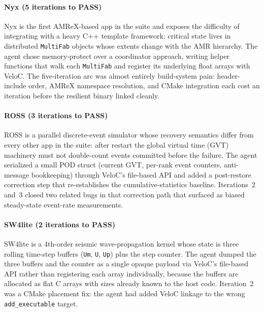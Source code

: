 \documentclass[conference]{IEEEtran}
\begin{document}
\paragraph{Nyx (5 iterations to PASS)}
Nyx is the first AMReX-based app in the suite and exposes the difficulty of integrating with a heavy C++ template framework: critical state lives in distributed \texttt{MultiFab} objects whose extents change with the AMR hierarchy. The agent chose memory-protect over a coordinator approach, writing helper functions that walk each \texttt{MultiFab} and register its underlying float arrays with VeloC. The five-iteration arc was almost entirely build-system pain: header-include order, AMReX namespace resolution, and CMake integration each cost an iteration before the resilient binary linked cleanly.

\paragraph{ROSS (3 iterations to PASS)}
ROSS is a parallel discrete-event simulator whose recovery semantics differ from every other app in the suite: after restart the global virtual time (GVT) machinery must not double-count events committed before the failure. The agent serialized a small POD struct (current GVT, per-rank event counters, anti-message bookkeeping) through VeloC's file-based API and added a post-restore correction step that re-establishes the cumulative-statistics baseline. Iterations~2 and~3 closed two related bugs in that correction path that surfaced as biased steady-state event-rate measurements.

\paragraph{SW4lite (2 iterations to PASS)}
SW4lite is a 4th-order seismic wave-propagation kernel whose state is three rolling time-step buffers (\texttt{Um}, \texttt{U}, \texttt{Up}) plus the step counter. The agent dumped the three buffers and the counter as a single opaque payload via VeloC's file-based API rather than registering each array individually, because the buffers are allocated as flat C arrays with sizes already known to the host code. Iteration~2 was a CMake placement fix: the agent had added VeloC linkage to the wrong \texttt{add\_executable} target.
\end{document}
